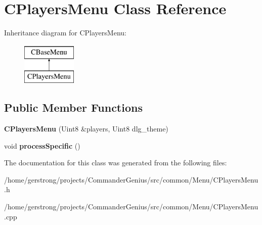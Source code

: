 \hypertarget{class_c_players_menu}{
\section{CPlayersMenu Class Reference}
\label{class_c_players_menu}
}
Inheritance diagram for CPlayersMenu:\begin{figure}[H]
\begin{center}
\leavevmode
\includegraphics[height=2cm]{class_c_players_menu}
\end{center}
\end{figure}
\subsection*{Public Member Functions}
\begin{DoxyCompactItemize}
\item 
\hypertarget{class_c_players_menu_a09833731e8f4f7bcbbe9c4efc8eab511}{
{\bfseries CPlayersMenu} (Uint8 \&players, Uint8 dlg\_\-theme)}
\label{class_c_players_menu_a09833731e8f4f7bcbbe9c4efc8eab511}

\item 
\hypertarget{class_c_players_menu_a287681ef649ef6229e22e181f1953c9b}{
void {\bfseries processSpecific} ()}
\label{class_c_players_menu_a287681ef649ef6229e22e181f1953c9b}

\end{DoxyCompactItemize}


The documentation for this class was generated from the following files:\begin{DoxyCompactItemize}
\item 
/home/gerstrong/projects/CommanderGenius/src/common/Menu/CPlayersMenu.h\item 
/home/gerstrong/projects/CommanderGenius/src/common/Menu/CPlayersMenu.cpp\end{DoxyCompactItemize}
